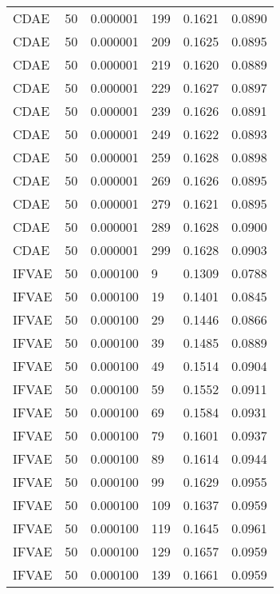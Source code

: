 \begin{tabular}{llrlrr}
    CDAE &   50 &  0.000001 &   199 &  0.1621 &       0.0890 \\
    CDAE &   50 &  0.000001 &   209 &  0.1625 &       0.0895 \\
    CDAE &   50 &  0.000001 &   219 &  0.1620 &       0.0889 \\
    CDAE &   50 &  0.000001 &   229 &  0.1627 &       0.0897 \\
    CDAE &   50 &  0.000001 &   239 &  0.1626 &       0.0891 \\
    CDAE &   50 &  0.000001 &   249 &  0.1622 &       0.0893 \\
    CDAE &   50 &  0.000001 &   259 &  0.1628 &       0.0898 \\
    CDAE &   50 &  0.000001 &   269 &  0.1626 &       0.0895 \\
    CDAE &   50 &  0.000001 &   279 &  0.1621 &       0.0895 \\
    CDAE &   50 &  0.000001 &   289 &  0.1628 &       0.0900 \\
    CDAE &   50 &  0.000001 &   299 &  0.1628 &       0.0903 \\
   IFVAE &   50 &  0.000100 &     9 &  0.1309 &       0.0788 \\
   IFVAE &   50 &  0.000100 &    19 &  0.1401 &       0.0845 \\
   IFVAE &   50 &  0.000100 &    29 &  0.1446 &       0.0866 \\
   IFVAE &   50 &  0.000100 &    39 &  0.1485 &       0.0889 \\
   IFVAE &   50 &  0.000100 &    49 &  0.1514 &       0.0904 \\
   IFVAE &   50 &  0.000100 &    59 &  0.1552 &       0.0911 \\
   IFVAE &   50 &  0.000100 &    69 &  0.1584 &       0.0931 \\
   IFVAE &   50 &  0.000100 &    79 &  0.1601 &       0.0937 \\
   IFVAE &   50 &  0.000100 &    89 &  0.1614 &       0.0944 \\
   IFVAE &   50 &  0.000100 &    99 &  0.1629 &       0.0955 \\
   IFVAE &   50 &  0.000100 &   109 &  0.1637 &       0.0959 \\
   IFVAE &   50 &  0.000100 &   119 &  0.1645 &       0.0961 \\
   IFVAE &   50 &  0.000100 &   129 &  0.1657 &       0.0959 \\
   IFVAE &   50 &  0.000100 &   139 &  0.1661 &       0.0959 \\

\end{tabular}
